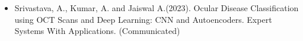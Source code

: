 \documentclass[12pt,a4paper,timesnewroman,twoside,openright]{report}
\begin{document}
\begin{itemize}
    \item [{[1]}] Srivastava, A., Kumar, A. and Jaiswal A.(2023). Ocular Disease Classification using OCT Scans and Deep Learning: CNN and Autoencoders.  Expert Systems With Applications. (Communicated)
\end{itemize}


%


\pagestyle{plain}








%
\singlespacing

\renewcommand{\bibname}{References}


% 

% 

\end{document}
